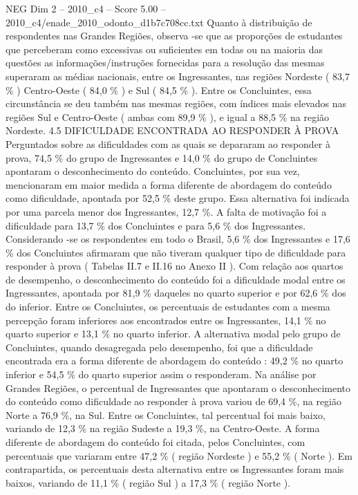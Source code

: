 \begin{textsample}{NEG Dim 2 – 2010\_c4 – Score 5.00 – 2010\_c4/enade\_2010\_odonto\_d1b7c708cc.txt}
Quanto à distribuição de respondentes nas Grandes Regiões, observa -se que as proporções de estudantes que perceberam como excessivas ou suficientes em todas ou na maioria das questões as informações/instruções fornecidas para a resolução das mesmas superaram as médias nacionais, entre os Ingressantes, nas regiões Nordeste ( 83,7 \% ) Centro-Oeste ( 84,0 \% ) e Sul ( 84,5 \% ).
Entre os Concluintes, essa circunstância se deu também nas mesmas regiões, com índices mais elevados nas regiões Sul e Centro-Oeste ( ambas com 89,9 \% ), e igual a 88,5 \% na região Nordeste. 4.5 DIFICULDADE ENCONTRADA AO RESPONDER À PROVA Perguntados sobre as dificuldades com as quais se depararam ao responder à prova, 74,5 \% do grupo de Ingressantes e 14,0 \% do grupo de Concluintes apontaram o desconhecimento do conteúdo.
Concluintes, por sua vez, mencionaram em maior medida a forma diferente de abordagem do conteúdo como dificuldade, apontada por 52,5 \% deste grupo.
Essa alternativa foi indicada por uma parcela menor dos Ingressantes, 12,7 \%.
A falta de motivação foi a dificuldade para 13,7 \% dos Concluintes e para 5,6 \% dos Ingressantes.
Considerando -se os respondentes em todo o Brasil, 5,6 \% dos Ingressantes e 17,6 \% dos Concluintes afirmaram que não tiveram qualquer tipo de dificuldade para responder à prova ( Tabelas II.7 e II.16 no Anexo II ).
Com relação aos quartos de desempenho, o desconhecimento do conteúdo foi a dificuldade modal entre os Ingressantes, apontada por 81,9 \% daqueles no quarto superior e por 62,6 \% dos do inferior.
Entre os Concluintes, os percentuais de estudantes com a mesma percepção foram inferiores aos encontrados entre os Ingressantes, 14,1 \% no quarto superior e 13,1 \% no quarto inferior.
A alternativa modal pelo grupo de Concluintes, quando desagregada pelo desempenho, foi que a dificuldade encontrada era a forma diferente de abordagem do conteúdo : 49,2 \% no quarto inferior e 54,5 \% do quarto superior assim o responderam.
Na análise por Grandes Regiões, o percentual de Ingressantes que apontaram o desconhecimento do conteúdo como dificuldade ao responder à prova variou de 69,4 \%, na região Norte a 76,9 \%, na Sul.
Entre os Concluintes, tal percentual foi mais baixo, variando de 12,3 \% na região Sudeste a 19,3 \%, na Centro-Oeste.
A forma diferente de abordagem do conteúdo foi citada, pelos Concluintes, com percentuais que variaram entre 47,2 \% ( região Nordeste ) e 55,2 \% ( Norte ).
Em contrapartida, os percentuais desta alternativa entre os Ingressantes foram mais baixos, variando de 11,1 \% ( região Sul ) a 17,3 \% ( região Norte ).

\end{textsample}
